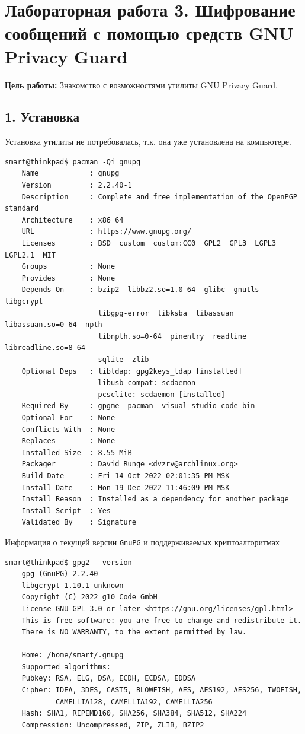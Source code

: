 \chapter*{Лабораторная работа 3. Шифрование сообщений с помощью средств GNU Privacy Guard}

\textbf{Цель работы:} Знакомство с возможностями утилиты GNU Privacy Guard.

\section*{1. Установка}
Установка утилиты не потребовалась, т.к. она уже установлена на компьютере.
\begin{Verbatim}[frame=single,breaklines=true,breakanywhere=true]
    smart@thinkpad$ pacman -Qi gnupg
    Name            : gnupg
    Version         : 2.2.40-1
    Description     : Complete and free implementation of the OpenPGP standard
    Architecture    : x86_64
    URL             : https://www.gnupg.org/
    Licenses        : BSD  custom  custom:CC0  GPL2  GPL3  LGPL3  LGPL2.1  MIT
    Groups          : None
    Provides        : None
    Depends On      : bzip2  libbz2.so=1.0-64  glibc  gnutls  libgcrypt
                      libgpg-error  libksba  libassuan  libassuan.so=0-64  npth
                      libnpth.so=0-64  pinentry  readline  libreadline.so=8-64
                      sqlite  zlib
    Optional Deps   : libldap: gpg2keys_ldap [installed]
                      libusb-compat: scdaemon
                      pcsclite: scdaemon [installed]
    Required By     : gpgme  pacman  visual-studio-code-bin
    Optional For    : None
    Conflicts With  : None
    Replaces        : None
    Installed Size  : 8.55 MiB
    Packager        : David Runge <dvzrv@archlinux.org>
    Build Date      : Fri 14 Oct 2022 02:01:35 PM MSK
    Install Date    : Mon 19 Dec 2022 11:46:09 PM MSK
    Install Reason  : Installed as a dependency for another package
    Install Script  : Yes
    Validated By    : Signature
\end{Verbatim}

Информация о текущей версии \texttt{GnuPG} и поддерживаемых криптоалгоритмах
\begin{Verbatim}[frame=single,breaklines=true,breakanywhere=true]
    smart@thinkpad$ gpg2 --version
    gpg (GnuPG) 2.2.40
    libgcrypt 1.10.1-unknown
    Copyright (C) 2022 g10 Code GmbH
    License GNU GPL-3.0-or-later <https://gnu.org/licenses/gpl.html>
    This is free software: you are free to change and redistribute it.
    There is NO WARRANTY, to the extent permitted by law.

    Home: /home/smart/.gnupg
    Supported algorithms:
    Pubkey: RSA, ELG, DSA, ECDH, ECDSA, EDDSA
    Cipher: IDEA, 3DES, CAST5, BLOWFISH, AES, AES192, AES256, TWOFISH,
            CAMELLIA128, CAMELLIA192, CAMELLIA256
    Hash: SHA1, RIPEMD160, SHA256, SHA384, SHA512, SHA224
    Compression: Uncompressed, ZIP, ZLIB, BZIP2
\end{Verbatim}

